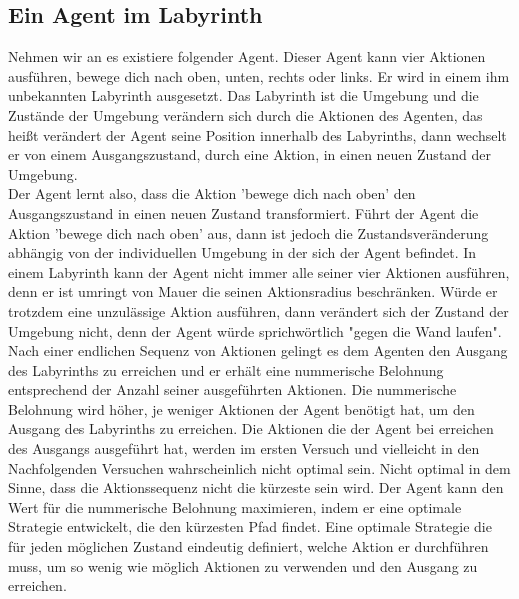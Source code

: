 \subsection{Ein Agent im Labyrinth}
Nehmen wir an es existiere folgender Agent. Dieser Agent kann vier Aktionen ausführen, bewege dich nach oben, unten, rechts oder links. Er wird in einem ihm unbekannten Labyrinth ausgesetzt. Das Labyrinth ist die Umgebung und die Zustände der Umgebung verändern sich durch die Aktionen des Agenten, das heißt verändert der Agent seine Position innerhalb des Labyrinths, dann wechselt er von einem Ausgangszustand, durch eine Aktion, in einen neuen Zustand der Umgebung. \\

Der Agent lernt also, dass die Aktion 'bewege dich nach oben' den Ausgangszustand in einen neuen Zustand transformiert. Führt der Agent die Aktion 'bewege dich nach oben' aus, dann ist jedoch die Zustandsveränderung abhängig von der individuellen Umgebung in der sich der Agent befindet. In einem Labyrinth kann der Agent nicht immer alle seiner vier Aktionen ausführen, denn er ist umringt von Mauer die seinen Aktionsradius beschränken. Würde er trotzdem eine unzulässige Aktion ausführen, dann verändert sich der Zustand der Umgebung nicht, denn der Agent würde sprichwörtlich "gegen die Wand laufen". \\

Nach einer endlichen Sequenz von Aktionen gelingt es dem Agenten den Ausgang des Labyrinths zu erreichen und er erhält eine nummerische Belohnung entsprechend der Anzahl seiner ausgeführten Aktionen. Die nummerische Belohnung wird höher, je weniger Aktionen der Agent benötigt hat, um den Ausgang des Labyrinths zu erreichen. Die Aktionen die der Agent bei erreichen des Ausgangs ausgeführt hat, werden im ersten Versuch und vielleicht in den Nachfolgenden Versuchen wahrscheinlich nicht optimal sein. Nicht optimal in dem Sinne, dass die Aktionssequenz nicht die kürzeste sein wird. Der Agent kann den Wert für die nummerische Belohnung maximieren, indem er eine optimale Strategie entwickelt, die den kürzesten Pfad findet. Eine optimale Strategie die für jeden möglichen Zustand eindeutig definiert, welche Aktion er durchführen muss, um so wenig wie möglich Aktionen zu verwenden und den Ausgang zu erreichen. \\

